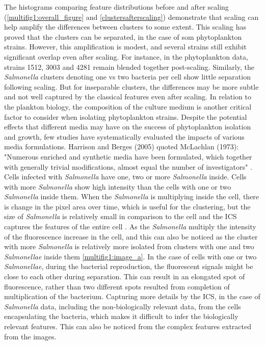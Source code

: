 \documentclass[12pt,a4paper]{article}
\begin{document}
The histograms comparing feature distributions before and after scaling (\ref{multifig1:overall_figure} and \ref{clustersafterscaling}) demonstrate that scaling can help amplify the differences between clusters to some extent. This scaling has proved that the clusters can be separated, in the case of som phytoplankton strains. However, this amplification is modest, and several strains still exhibit significant overlap even after scaling. For instance, in the phytoplankton data, strains 1512, 3003 and 4281 remain blended together post-scaling. Similarly, the \textit{Salmonella} clusters denoting one vs two bacteria per cell show little separation following scaling. But for inseparable clusters, the differences may be more subtle and not well captured by the classical features even after scaling. In relation to the plankton biology, the composition of the culture medium is another critical factor to consider when isolating phytoplankton strains. Despite the potential effects that different media may have on the success of phytoplankton isolation and growth, few studies have systematically evaluated the impacts of various media formulations. Harrison and Berges (2005) quoted McLachlan (1973): "Numerous enriched and synthetic media have been formulated, which together with generally trivial modifications, almost equal the number of investigators" \cite{HarrisonPaul}. Cells infected with \textit{Salmonella} have one, two or more \textit{Salmonella} inside. Cells with more \textit{Salmonella} show high intensity than the cells with one or two \textit{Salmonella} inside them. When the \textit{Salmonella} is multiplying inside the cell, there is change in the pixel area over time, which is useful for the clustering, but the size of \textit{Salmonella} is relatively small in comparison to the cell and the ICS captures the features of the entire cell \cite{fàbrega_vila_2013}. As the \textit{Salmonella} multiply the intensity of the fluorescence increase in the cell, and this can also be noticed as the cluster with more \textit{Salmonella} is relatively more isolated from clusters with one and two \textit{Salmonellae} inside them \ref{multifig1:image_a}. In the case of cells with one or two \textit{Salmonellae}, during the bacterial reproduction, the fluorescent signals might be close to each other during separation. This can result in an elongated spot of fluorescence, rather than two different spots resulted from completion of multiplication of the bacterium. Capturing more details by the ICS, in the case of \textit{Salmonella} data, including the non-biologically relevant data, from the cells encapsulating the bacteria, which makes it difficult to infer the biologically relevant features. This can also be noticed from the complex features extracted from the images.
\end{document}
